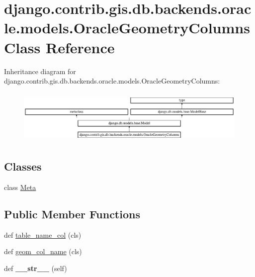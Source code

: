 \hypertarget{classdjango_1_1contrib_1_1gis_1_1db_1_1backends_1_1oracle_1_1models_1_1_oracle_geometry_columns}{}\section{django.\+contrib.\+gis.\+db.\+backends.\+oracle.\+models.\+Oracle\+Geometry\+Columns Class Reference}
\label{classdjango_1_1contrib_1_1gis_1_1db_1_1backends_1_1oracle_1_1models_1_1_oracle_geometry_columns}
Inheritance diagram for django.\+contrib.\+gis.\+db.\+backends.\+oracle.\+models.\+Oracle\+Geometry\+Columns\+:\begin{figure}[H]
\begin{center}
\leavevmode
\includegraphics[height=2.635294cm]{classdjango_1_1contrib_1_1gis_1_1db_1_1backends_1_1oracle_1_1models_1_1_oracle_geometry_columns}
\end{center}
\end{figure}
\subsection*{Classes}
\begin{DoxyCompactItemize}
\item 
class \mbox{\hyperlink{classdjango_1_1contrib_1_1gis_1_1db_1_1backends_1_1oracle_1_1models_1_1_oracle_geometry_columns_1_1_meta}{Meta}}
\end{DoxyCompactItemize}
\subsection*{Public Member Functions}
\begin{DoxyCompactItemize}
\item 
def \mbox{\hyperlink{classdjango_1_1contrib_1_1gis_1_1db_1_1backends_1_1oracle_1_1models_1_1_oracle_geometry_columns_a50773f9657396ac35cf79e111c9f6d7a}{table\+\_\+name\+\_\+col}} (cls)
\item 
def \mbox{\hyperlink{classdjango_1_1contrib_1_1gis_1_1db_1_1backends_1_1oracle_1_1models_1_1_oracle_geometry_columns_a2f2e5f0880ef75f9d712954532365732}{geom\+\_\+col\+\_\+name}} (cls)
\item 
\mbox{\label{classdjango_1_1contrib_1_1gis_1_1db_1_1backends_1_1oracle_1_1models_1_1_oracle_geometry_columns_ae1ff1f7807e91ca8f91718582d345b57}} 
def {\bfseries \+\_\+\+\_\+str\+\_\+\+\_\+} (self)
\end{DoxyCompactItemize}
